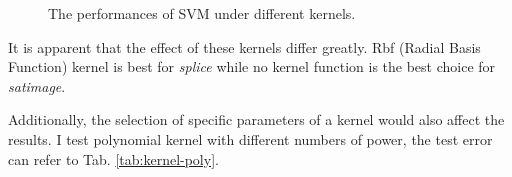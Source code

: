 \documentclass[12pt,a4paper]{article}
\theoremstyle{definition}
\begin{document}
\begin{figure}[H]
	\centering
	\caption{The performances of SVM under different kernels.}
	\label{fig:svm-kernel}
\end{figure}

It is apparent that the effect of these kernels differ greatly. Rbf (Radial Basis Function) kernel is best for \textit{splice} while no kernel function is the best choice for \textit{satimage}.

\vspace{0.01\linewidth}
Additionally, the selection of specific parameters of a kernel would also affect the results. I test polynomial kernel with different numbers of power, the test error can refer to Tab. \ref{tab:kernel-poly}.
\end{document}
